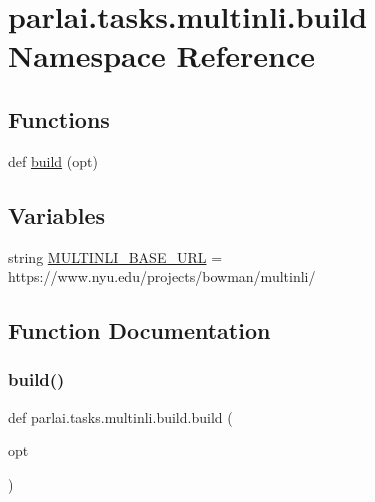 \hypertarget{namespaceparlai_1_1tasks_1_1multinli_1_1build}{}\section{parlai.\+tasks.\+multinli.\+build Namespace Reference}
\label{namespaceparlai_1_1tasks_1_1multinli_1_1build}
\subsection*{Functions}
\begin{DoxyCompactItemize}
\item 
def \hyperlink{namespaceparlai_1_1tasks_1_1multinli_1_1build_a60231d246ac9f217dd74894970a30c27}{build} (opt)
\end{DoxyCompactItemize}
\subsection*{Variables}
\begin{DoxyCompactItemize}
\item 
string \hyperlink{namespaceparlai_1_1tasks_1_1multinli_1_1build_a2d350bc6dab29e2843ab0fe4dbba3489}{M\+U\+L\+T\+I\+N\+L\+I\+\_\+\+B\+A\+S\+E\+\_\+\+U\+RL} = \textquotesingle{}https\+://www.\+nyu.\+edu/projects/bowman/multinli/\textquotesingle{}
\end{DoxyCompactItemize}


\subsection{Function Documentation}
\mbox{\label{namespaceparlai_1_1tasks_1_1multinli_1_1build_a60231d246ac9f217dd74894970a30c27}} 
\subsubsection{\texorpdfstring{build()}{build()}}
{\footnotesize\ttfamily def parlai.\+tasks.\+multinli.\+build.\+build (\begin{DoxyParamCaption}\item[{}]{opt }\end{DoxyParamCaption})}



